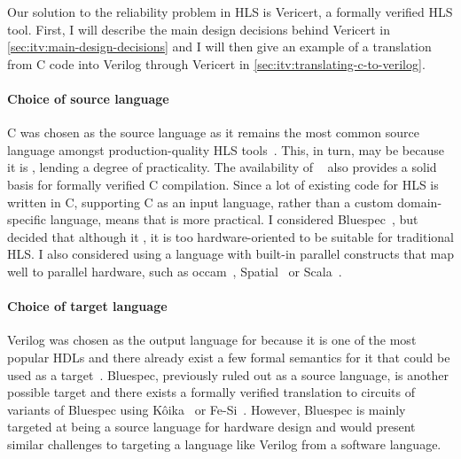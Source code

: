 Our solution to the reliability problem in \gls{HLS} is Vericert, a formally
verified \gls{HLS} tool.  First, I will describe the main design decisions
behind Vericert in \cref{sec:itv:main-design-decisions} and I will then give an
example of a translation from C code into Verilog through Vericert in
\cref{sec:itv:translating-c-to-verilog}.

\paragraph{Choice of source language}

C was chosen as the source language as it remains the most common source
language amongst production-quality HLS tools~\cite{canis13_l,
  amd23_vitis_high_synth, intel20_hsc, pilato13_bambu}. This, in turn, may be
because it is , lending a
degree of practicality.  The availability of
\compcert{}~\cite{leroy09_formal_verif_realis_compil} also provides a solid
basis for formally verified C compilation.  Since a lot of existing code for HLS
is written in C, supporting C as an input language, rather than a custom
domain-specific language, means that \vericert{} is more practical.  I
considered Bluespec~\cite{nikhil04_bsv}, but decided that although it
, it is too hardware-oriented to be suitable for traditional HLS.  I
also considered using a language with built-in parallel constructs that map well
to parallel hardware, such as occam~\cite{page91_compil_occam},
Spatial~\cite{koeplinger18_s} or Scala~\cite{bachrach12_chisel}.

\paragraph{Choice of target language}

Verilog was chosen as the output language for \vericert{} because it is one of
the most popular HDLs and there already exist a few formal semantics for it that
could be used as a target~\cite{lööw19_verif_compil_verif_proces,
  meredith10_veril}.  Bluespec, previously ruled out as a source language, is
another possible target and there exists a formally verified translation to
circuits of variants of Bluespec using K\^{o}ika~\cite{bourgeat20_essen_blues}
or Fe-Si~\cite{braibant13_formal_verif_hardw_synth}.  However, Bluespec is
mainly targeted at being a source language for hardware design and would present
similar challenges to targeting a language like Verilog from a software
language.

